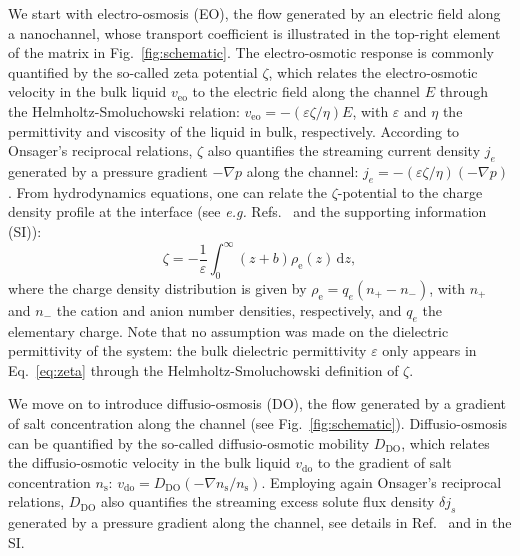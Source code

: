 \documentclass[journal=ancac3,manuscript=article,layout=twocolumn]{achemso}
\newcommand{\df}{\mathrm{d}}
\newcommand{\eps}{\varepsilon}
\newcommand{\rhoe}{\rho_\text{e}}
\newcommand{\ns}{n_\text{s}}
\begin{document}
We start with electro-osmosis (EO), the flow generated by an electric field along a nanochannel, whose transport coefficient is illustrated in the top-right element of the matrix in Fig.~\ref{fig:schematic}.
%
The electro-osmotic response is commonly quantified by the so-called zeta potential $\zeta$, which relates the electro-osmotic velocity in the bulk liquid $v_\text{eo}$ to the electric field along the channel $E$ through the Helmholtz-Smoluchowski relation: $v_\text{eo} = -(\eps \zeta / \eta) E$, with $\eps$ and $\eta$ the permittivity and viscosity of the liquid in bulk, respectively.
%
According to Onsager's reciprocal relations, $\zeta$ also quantifies the streaming current density $j_e$ generated by a pressure gradient $-\nabla p$ along the channel: $j_e = -(\varepsilon \zeta / \eta) (-\nabla p)$.
From hydrodynamics equations,
one can relate the $\zeta$-potential to the charge density profile at the interface
(see \textit{e.g.} Refs.~ and the supporting information (SI)):
\begin{equation}
\label{eq:zeta}
    \zeta = - \frac{1}{\eps} \int_0^{\infty}
    (z + b) \rhoe(z) \,\df z ,
\end{equation}
where the charge density
distribution is given by
$\rhoe = q_e\left(n_+ - n_-\right)$, with $n_+$ and
$n_-$ the cation and anion number
densities, respectively,
and $q_e$ the elementary charge.
Note that no assumption was made on the dielectric permittivity of the system: the bulk dielectric permittivity $\eps$ only appears in Eq.~\eqref{eq:zeta} through the Helmholtz-Smoluchowski definition of $\zeta$.

We move on to introduce diffusio-osmosis (DO), the flow generated by a gradient of salt concentration along the channel\cite{anderson1989colloid} (see Fig.~\ref{fig:schematic}). Diffusio-osmosis can be quantified by the so-called diffusio-osmotic mobility $D_\text{DO}$, which relates the diffusio-osmotic velocity in the bulk liquid $v_\text{do}$ to the gradient of salt concentration $\ns$: $v_\text{do} = D_\text{DO} (-\nabla \ns / \ns)$.
Employing again Onsager's reciprocal relations, $D_\text{DO}$ also quantifies the streaming excess solute flux density $\delta j_s$
generated by a pressure gradient
along the channel,
see details in Ref.~ and in the SI.
\end{document}
